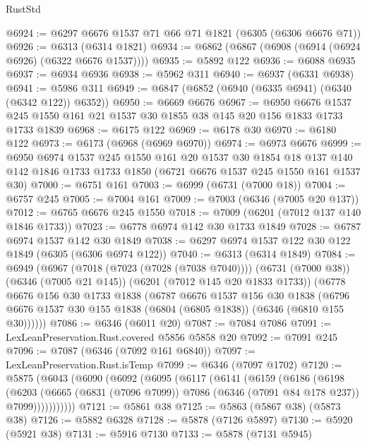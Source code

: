 \begin{lexlean}{RustStd}
\begin{coremodule}
@6924 := @6297 @6676 @1537 @71 @66 @71 @1821 (@6305 (@6306 @6676 @71))
@6926 := @6313 (@6314 @1821)
@6934 := @6862 (@6867 (@6908 (@6914 (@6924 @6926) (@6322 @6676 @1537))))
@6935 := @5892 @122
@6936 := @6088 @6935
@6937 := @6934 @6936
@6938 := @5962 @311
@6940 := @6937 (@6331 @6938)
@6941 := @5986 @311
@6949 := @6847 (@6852 (@6940 (@6335 @6941) (@6340 (@6342 @122)) @6352))
@6950 := @6669 @6676
@6967 := @6950
    @6676
    @1537
    @245
    @1550
    @161
    @21
    @1537
    @30
    @1855
    @38
    @145
    @20
    @156
    @1833
    @1733
    @1733
    @1839
@6968 := @6175 @122
@6969 := @6178 @30
@6970 := @6180 @122
@6973 := @6173 (@6968 (@6969 @6970))
@6974 := @6973 @6676
@6999 := @6950
    @6974
    @1537
    @245
    @1550
    @161
    @20
    @1537
    @30
    @1854
    @18
    @137
    @140
    @142
    @1846
    @1733
    @1733
    @1850
    (@6721 @6676 @1537 @245 @1550 @161 @1537 @30)
@7000 := @6751 @161
@7003 := @6999 (@6731 (@7000 @18))
@7004 := @6757 @245
@7005 := @7004 @161
@7009 := @7003 (@6346 (@7005 @20 @137))
@7012 := @6765 @6676 @245 @1550
@7018 := @7009 (@6201 (@7012 @137 @140 @1846 @1733))
@7023 := @6778 @6974 @142 @30 @1733 @1849
@7028 := @6787 @6974 @1537 @142 @30 @1849
@7038 := @6297 @6974 @1537 @122 @30 @122 @1849 (@6305 (@6306 @6974 @122))
@7040 := @6313 (@6314 @1849)
@7084 := @6949
    (@6967
      (@7018 (@7023 (@7028 (@7038 @7040))))
      (@6731 (@7000 @38))
      (@6346 (@7005 @21 @145))
      (@6201 (@7012 @145 @20 @1833 @1733))
      (@6778
        @6676
        @156
        @30
        @1733
        @1838
        (@6787
          @6676
          @1537
          @156
          @30
          @1838
          (@6796 @6676 @1537 @30 @155 @1838 (@6804 (@6805 @1838)) (@6346 (@6810 @155 @30))))))
@7086 := @6346 (@6011 @20)
@7087 := @7084 @7086
@7091 := LexLeanPreservation.Rust.covered @5856 @5858 @20
@7092 := @7091 @245
@7096 := @7087 (@6346 (@7092 @161 @6840))
@7097 := LexLeanPreservation.Rust.isTemp
@7099 := @6346 (@7097 @1702)
@7120 := @5875
    (@6043
      (@6090
        (@6092
          (@6095
            (@6117
              (@6141
                (@6159
                  (@6186
                    (@6198
                      (@6203
                        (@6665
                          (@6831 (@7096 @7099))
                          @7086
                          (@6346 (@7091 @84 @178 @237))
                          @7099)))))))))))
@7121 := @5861 @38
@7125 := @5863 (@5867 @38) (@5873 @38)
@7126 := @5882 @6328
@7128 := @5878 (@7126 @5897)
@7130 := @5920 (@5921 @38)
@7131 := @5916 @7130
@7133 := @5878 (@7131 @5945)

\end{coremodule}
\end{lexlean}
